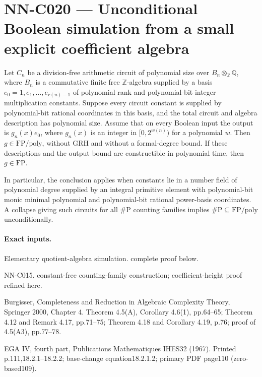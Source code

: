 \section{NN-C020 --- Unconditional Boolean simulation from a small explicit coefficient algebra}
\begin{proposition}[NN-C020]
Let $C_n$ be a division-free arithmetic circuit of polynomial size over $B_n\otimes_{\mathbb Z}\mathbb Q$, where $B_n$ is a commutative finite free $\mathbb Z$-algebra supplied by a basis $e_0=1,e_1,\ldots,e_{r(n)-1}$ of polynomial rank and polynomial-bit integer multiplication constants. Suppose every circuit constant is supplied by polynomial-bit rational coordinates in this basis, and the total circuit and algebra description has polynomial size. Assume that on every Boolean input the output is $g_n(x)e_0$, where $g_n(x)$ is an integer in $[0,2^{w(n)})$ for a polynomial $w$. Then $g\in\mathrm{FP}/\mathrm{poly}$, without GRH and without a formal-degree bound. If these descriptions and the output bound are constructible in polynomial time, then $g\in\mathrm{FP}$.

In particular, the conclusion applies when constants lie in a number field of polynomial degree supplied by an integral primitive element with polynomial-bit monic minimal polynomial and polynomial-bit rational power-basis coordinates. A collapse giving such circuits for all $\#\mathrm P$ counting families implies $\#\mathrm P\subseteq\mathrm{FP}/\mathrm{poly}$ unconditionally.
\end{proposition}
\paragraph{Exact inputs.}
Elementary quotient-algebra simulation. complete proof below.

NN-C015. constant-free counting-family construction; coefficient-height proof refined here.

Burgisser, Completeness and Reduction in Algebraic Complexity Theory, Springer 2000, Chapter 4. Theorem 4.5(A), Corollary 4.6(1), pp.64--65; Theorem 4.12 and Remark 4.17, pp.71--75; Theorem 4.18 and Corollary 4.19, p.76; proof of 4.5(A3), pp.77--78.

EGA IV, fourth part, Publications Mathematiques IHES32 (1967). Printed p.111,18.2.1--18.2.2; base-change equation18.2.1.2; primary PDF page110 (zero-based109).

